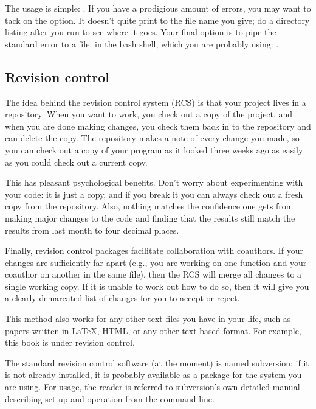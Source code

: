 \documentclass[12pt]{article}
\begin{document}
The usage is simple: . If you have a prodigious amount
of errors, you may want to tack on the  option. It doesn't
quite print to the file name you give; do a directory listing after you run  to see where it goes.  Your final option is to pipe the standard
error to a file: in the bash shell, which you are probably using: .

\subsection{Revision control}  \label{valgrind}
The idea behind the revision control system (RCS) is that your project
lives in a repository. When you want to work, you check out
a copy of the project, and when you are done making changes, you check
them back in to the repository and can delete the copy.  The repository
makes a note of every change you made, so you can check out a copy of
your program as it looked three weeks ago as easily as you could check
out a current copy.

This has pleasant psychological benefits. Don't worry about experimenting
with your code: it is just a copy, and if you break it you can always check
out a fresh copy from the repository. Also, nothing matches the confidence
one gets from making major changes to the code and finding that the
results still match the results from last month to four decimal places.

Finally, revision control packages facilitate collaboration with
coauthors. If your changes are sufficiently far apart (e.g., you are
working on one function and your coauthor on another in the same file),
then the RCS will merge all changes to a single working copy. If
it is unable to work out how to do so, then it will give you a
clearly demarcated list of changes for you to accept or reject.

This method also works for any other text files you have in your
life, such as papers written in \LaTeX, HTML, or any other text-based
format. For example, this book is under revision control.

The standard revision control software (at the moment) is named
subversion; if it is not already installed, it is probably available as
a package for the system you are using. For usage, the reader is referred
to subversion's own detailed manual describing set-up and operation from
the command line.
\end{document}
